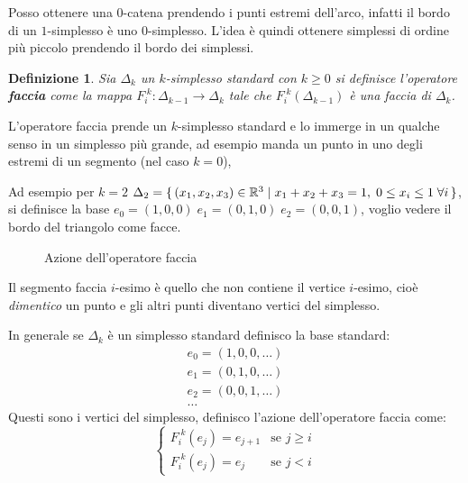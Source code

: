 \documentclass[10pt, twoside=false, x11names]{scrbook}
\newtheorem{definition}[theorem]{Definizione}
\newcommand{\RN}[1][]{\mathbb{R}^#1}
\begin{document}
Posso ottenere una $ 0 $-catena prendendo i punti estremi dell'arco, infatti il bordo di un $ 1 $-simplesso
è uno $ 0 $-simplesso. L'idea è quindi ottenere simplessi di ordine più piccolo prendendo il
bordo dei simplessi.

\begin{definition}
  Sia $ \Delta_k $ un $ k $-simplesso standard con $ k \geq 0 $ si definisce l'operatore \textbf{faccia}
  come la mappa $ F_i^{\;k}: \Delta_{k-1} \to \Delta_k $ tale che $ F_i^{\;k}(\Delta_{k-1}) $ è una faccia di $ \Delta_k $.
\end{definition}
L'operatore faccia prende un $ k $-simplesso standard e lo immerge in un qualche senso in un
simplesso più grande, ad esempio manda un punto in uno degli estremi di un segmento (nel caso $ k = 0 $),

Ad esempio per $ k = 2 $ $ \Delta_2 = \set{ (x_1,x_2,x_3) \in \RN{3} | x_1 + x_2 + x_3 = 1, \; 0 \leq x_i \leq 1 \; \forall i} $,
si definisce la base $ e_0 = (1,0,0) \; e_1 = (0,1,0) \; e_2 = (0,0,1) $, voglio vedere il bordo del triangolo
come facce.

\begin{figure}[htbp]
  \centering
  \caption{Azione dell'operatore faccia}
  \label{fig:lez1:standard_simplex_faces}
\end{figure}
Il segmento faccia $ i $-esimo è quello che non contiene il vertice $ i $-esimo, cioè
\emph{dimentico} un punto e gli altri punti diventano vertici del simplesso.

In generale se $ \Delta_k $ è un simplesso standard definisco la base standard:
\begin{gather*}
  e_0 = (1,0,0,\dots)                            \\
  e_1 = (0,1,0,\dots)                            \\
  e_2 = (0,0,1,\dots)                            \\
  \dots
\end{gather*}
Questi sono i vertici del simplesso, definisco l'azione dell'operatore faccia
come:
\[
  \begin{cases}
    F_i^{\; k}(e_j) = e_{j+1}     & \text{se } j \geq i \\
    F_i^{\; k}(e_j) = e_{j} & \text{se } j < i
  \end{cases}
\]
\end{document}
